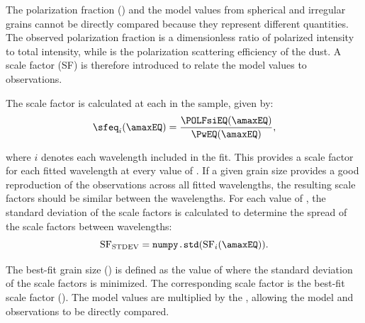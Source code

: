 
The polarization fraction (\POLFsiNS) and the \Pw model values from spherical and irregular grains cannot be directly compared because they represent different quantities. The observed polarization fraction is a dimensionless ratio of polarized intensity to total intensity, while \Pw is the polarization scattering efficiency of the dust. A scale factor (SF) is therefore introduced to relate the model values to observations. 


The scale factor is calculated at each \amax in the sample, given by:
\begin{equation}
\sfeq_i(\amaxEQ) = \frac{\POLFsiEQ(\amaxEQ)}{\PwEQ(\amaxEQ)},
    \label{eq: sf}
\end{equation}


\noindent where $i$ denotes each wavelength included in the fit. This provides a scale factor for each fitted wavelength at every value of \amaxNS. If a given grain size provides a good reproduction of the observations across all fitted wavelengths, the resulting scale factors should be similar between the wavelengths. For each value of \amaxNS, the standard deviation of the scale factors is calculated to determine the spread of the scale factors between wavelengths:
\begin{equation}
    \text{SF}_{\text{STDEV}} = \texttt{numpy.std}(\text{SF}_i(\amaxEQ)).
    \label{eq: sf_std}
\end{equation}

The best-fit grain size (\amaxbestNS) is defined as the value of \amax where the standard deviation of the scale factors is minimized. The corresponding scale factor is the best-fit scale factor (\sfbestNS). The model \Pw values are multiplied by the \sfbestNS, allowing the model and observations to be directly compared.
 
